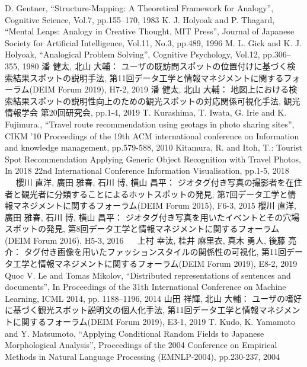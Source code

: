 \documentclass{deimj}
\begin{document}
\vspace{2em}
\begin{thebibliography}{99}
    D. Gentner,
      ``Structure-Mapping: A Theoretical Framework for Analogy'',
      Cognitive Science, Vol.7, pp.155–170, 1983
    K. J. Holyoak and P. Thagard,
      ``Mental Leaps: Analogy in Creative Thought, MIT Press'',
      Journal of Japanese Society for Artificial Intelligence,  Vol.11, No.3,  pp.489, 1996
    M. L. Gick and K. J. Holyoak,
      ``Analogical Problem Solving'',
      Cognitive Psychology, Vol.12, pp.306–355, 1980
    潘 健太, 北山 大輔：
      ユーザの既訪問スポットの位置付けに基づく検索結果スポットの説明手法,
      第11回データ工学と情報マネジメントに関するフォーラム(DEIM Forum 2019), H7-2, 2019
    潘 健太, 北山 大輔：
      地図上における検索結果スポットの説明性向上のための観光スポットの対応関係可視化手法,
      観光情報学会 第20回研究会, pp.1-4, 2019
    T. Kurashima, T. Iwata, G. Irie and K. Fujimura.,
      ``Travel route recommendation using geotags in photo sharing sites'',
      CIKM '10 Proceedings of the 19th ACM international conference on Information and knowledge management, pp.579-588, 2010
    Kitamura, R. and Itoh, T.:
      Tourist Spot Recommendation Applying Generic Object Recognition with Travel Photos,
      In 2018 22nd International Conference Information Visualisation, pp.1-5, 2018
    櫻川 直洋, 廣田 雅春, 石川 博, 横山 昌平：
      ジオタグ付き写真の撮影者を在住者と観光者に分類することによるホットスポットの発見,
      第7回データ工学と情報マネジメントに関するフォーラム(DEIM Forum 2015), F6-3, 2015
    櫻川 直洋, 廣田 雅春, 石川 博, 横山 昌平：
      ジオタグ付き写真を用いたイベントとその穴場スポットの発見,
      第8回データ工学と情報マネジメントに関するフォーラム(DEIM Forum 2016), H5-3, 2016
    上村 幸汰, 桂井 麻里衣, 真木 勇人, 後藤 亮介：
      タグ付き画像を用いたファッションスタイルの関係性の可視化,
      第11回データ工学と情報マネジメントに関するフォーラム(DEIM Forum 2019), E8-2, 2019
    Quoc V. Le and Tomas Mikolov,
      ``Distributed representations of sentences and documents'',
      In Proceedings of the 31th International Conference on Machine Learning, ICML 2014, pp. 1188–1196, 2014
    山田 祥輝, 北山 大輔：
      ユーザの嗜好に基づく観光スポット説明文の個人化手法,
      第11回データ工学と情報マネジメントに関するフォーラム(DEIM Forum 2019), E3-1, 2019
    T. Kudo, K. Yamamoto and Y. Matsumoto,
      ``Applying Conditional Random Fields to Japanese Morphological Analysis'',
      Proceedings of the 2004 Conference on Empirical Methods in Natural Language Processing (EMNLP-2004), pp.230-237, 2004
\end{thebibliography}
\end{document}
